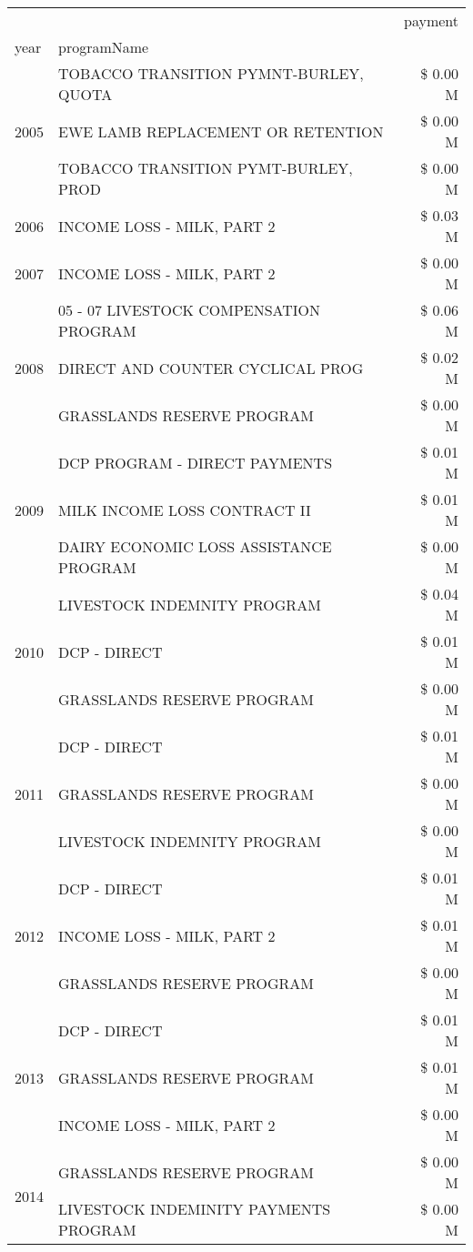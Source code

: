 \begin{tabular}{llr}
\toprule
 &  & payment \\
year & programName &  \\
\midrule
\multirow[t]{3}{*}{2005} & TOBACCO TRANSITION PYMNT-BURLEY, QUOTA & \$ 0.00 M \\
 & EWE LAMB REPLACEMENT OR RETENTION & \$ 0.00 M \\
 & TOBACCO TRANSITION PYMT-BURLEY, PROD & \$ 0.00 M \\
\cline{1-3}
2006 & INCOME LOSS - MILK, PART 2 & \$ 0.03 M \\
\cline{1-3}
2007 & INCOME LOSS - MILK, PART 2 & \$ 0.00 M \\
\cline{1-3}
\multirow[t]{3}{*}{2008} & 05 - 07 LIVESTOCK COMPENSATION PROGRAM & \$ 0.06 M \\
 & DIRECT AND COUNTER CYCLICAL PROG & \$ 0.02 M \\
 & GRASSLANDS RESERVE PROGRAM & \$ 0.00 M \\
\cline{1-3}
\multirow[t]{3}{*}{2009} & DCP PROGRAM - DIRECT PAYMENTS & \$ 0.01 M \\
 & MILK INCOME LOSS CONTRACT II & \$ 0.01 M \\
 & DAIRY ECONOMIC LOSS ASSISTANCE PROGRAM & \$ 0.00 M \\
\cline{1-3}
\multirow[t]{3}{*}{2010} & LIVESTOCK INDEMNITY PROGRAM & \$ 0.04 M \\
 & DCP - DIRECT & \$ 0.01 M \\
 & GRASSLANDS RESERVE PROGRAM & \$ 0.00 M \\
\cline{1-3}
\multirow[t]{3}{*}{2011} & DCP - DIRECT & \$ 0.01 M \\
 & GRASSLANDS RESERVE PROGRAM & \$ 0.00 M \\
 & LIVESTOCK INDEMNITY PROGRAM & \$ 0.00 M \\
\cline{1-3}
\multirow[t]{3}{*}{2012} & DCP - DIRECT & \$ 0.01 M \\
 & INCOME LOSS - MILK, PART 2 & \$ 0.01 M \\
 & GRASSLANDS RESERVE PROGRAM & \$ 0.00 M \\
\cline{1-3}
\multirow[t]{3}{*}{2013} & DCP - DIRECT & \$ 0.01 M \\
 & GRASSLANDS RESERVE PROGRAM & \$ 0.01 M \\
 & INCOME LOSS - MILK, PART 2 & \$ 0.00 M \\
\cline{1-3}
\multirow[t]{2}{*}{2014} & GRASSLANDS RESERVE PROGRAM & \$ 0.00 M \\
 & LIVESTOCK INDEMINITY PAYMENTS PROGRAM & \$ 0.00 M \\

\end{tabular}
